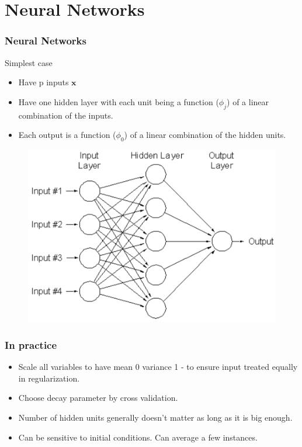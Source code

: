 \documentclass{beamer}
\begin{document}
\section{Neural Networks}
\begin{frame}
	\frametitle{Neural Networks}
	Simplest case
	\begin{itemize}
		\item Have p inputs $\pmb{x}$
		\item Have one hidden layer with each unit being a function ($\phi_j$) of a linear combination of the inputs. 
		\item Each output is a function ($\phi_0$) of a linear combination of the hidden units.
	\end{itemize}
	
	\begin{figure}
	\includegraphics{nnet.pdf}
	\end{figure}
	
\end{frame}


\begin{frame}
	\frametitle{In practice}
	\begin{itemize}
		\item Scale all variables to have mean 0 variance 1 - to ensure input treated equally in regularization.
		\item Choose decay parameter by cross validation.
		\item Number of hidden units generally doesn't matter as long as it is big enough.
		\item Can be sensitive to initial conditions.  Can average a few instances.
	\end{itemize}
\end{frame}
\end{document}

